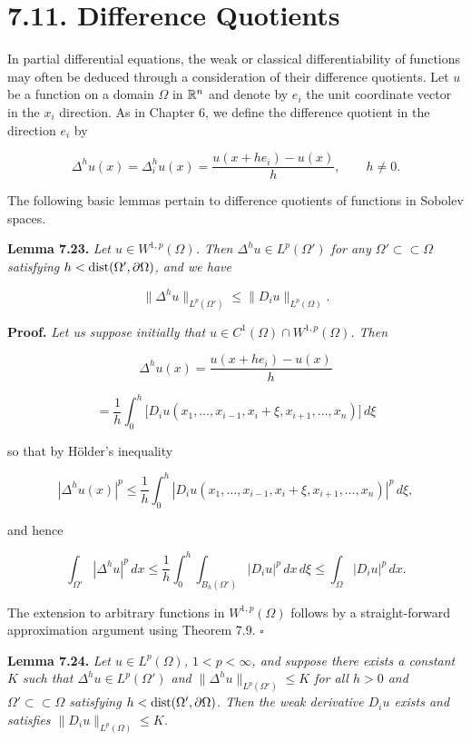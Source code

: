 \section*{7.11. Difference Quotients}

In partial differential equations, the weak or classical differentiability of functions
may often be deduced through a consideration of their difference quotients. Let $u$
be a function on a domain $\Omega$ in $\mathbb{R}^n$ and denote by $e_i$ the unit coordinate vector in
the $x_i$ direction. As in Chapter 6, we define the difference quotient in the direction
$e_i$ by

\begin{equation}
\tag{7.53}
\Delta^h u(x)=\Delta_i^h u(x)=\frac{u(x+he_i)-u(x)}{h},\qquad h\ne 0.
\end{equation}

The following basic lemmas pertain to difference quotients of functions in Sobolev
spaces.

\textbf{Lemma 7.23.} \emph{Let $u\in W^{1,p}(\Omega)$. Then $\Delta^h u\in L^p(\Omega')$ for any $\Omega'\subset \subset \Omega$ satisfying
$h<\operatorname{dist}(\Omega',\partial\Omega)$, and we have}

\[
\|\Delta^h u\|_{L^p(\Omega')}\le \|D_i u\|_{L^p(\Omega)}.
\]

\textbf{Proof.} \emph{Let us suppose initially that $u\in C^1(\Omega)\cap W^{1,p}(\Omega)$. Then}

\[
\Delta^h u(x)=\frac{u(x+he_i)-u(x)}{h}
\]

\[
=\frac{1}{h}\int_0^h \bigl[D_i u(x_1,\ldots,x_{i-1},x_i+\xi,x_{i+1},\ldots,x_n)\bigr]\,d\xi
\]


so that by H\"older's inequality

\[
|\Delta^h u(x)|^p \le \frac{1}{h}\int_0^h \left|D_i u(x_1,\ldots, x_{i-1}, x_i+\xi, x_{i+1},\ldots, x_n)\right|^p\,d\xi,
\]

and hence

\[
\int_{\Omega'} |\Delta^h u|^p\,dx \le \frac{1}{h}\int_0^h \int_{B_h(\Omega')} |D_i u|^p\,dx\,d\xi \le \int_{\Omega} |D_i u|^p\,dx.
\]

The extension to arbitrary functions in $W^{1,p}(\Omega)$ follows by a straight-forward
approximation argument using Theorem 7.9. $\square$

\medskip

\textbf{Lemma 7.24.} \emph{Let $u\in L^p(\Omega)$, $1<p<\infty$, and suppose there exists a constant $K$
such that $\Delta^h u\in L^p(\Omega')$ and $\|\Delta^h u\|_{L^p(\Omega')}\le K$ for all $h>0$ and $\Omega' \subset \subset \Omega$ satisfying
$h<\operatorname{dist}(\Omega',\partial\Omega)$. Then the weak derivative $D_i u$ exists and satisfies $\|D_i u\|_{L^p(\Omega)}\le K$.}

